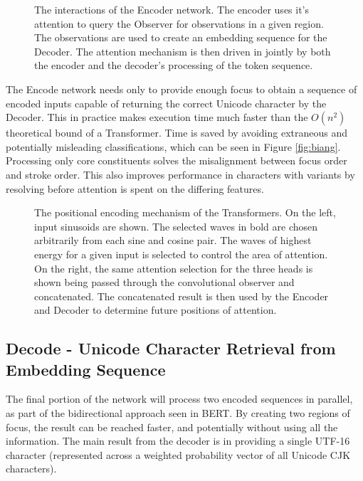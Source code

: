 \begin{figure*}[h]
    \begin{center}
        
        \caption[Embedding Sequence Generation]{The interactions of the Encoder network.
            The encoder uses it's attention to query the Observer for observations in a given region.
            The observations are used to create an embedding sequence for the Decoder.
            The attention mechanism is then driven in jointly by both the encoder and the decoder's processing of the token sequence. }
        \label{fig:encoder}
    \end{center}
\end{figure*}

The Encode network needs only to provide enough focus to obtain a sequence of encoded inputs capable of returning the correct Unicode character by the Decoder. This in practice makes execution time much faster than the $O(n^2)$ theoretical bound of a Transformer. Time is saved by avoiding extraneous and potentially misleading classifications, which can be seen in Figure \ref{fig:biang}. Processing only core constituents solves the misalignment between focus order and stroke order. This also improves performance in characters with variants by resolving before attention is spent on the differing features.

\begin{figure*}
    \begin{center}
        
        \caption[Multi-head Positional Encoding of Transformer]{The positional encoding mechanism of the Transformers. On the left, input sinusoids are shown. The selected waves in bold are chosen arbitrarily from each sine and cosine pair. The waves of highest energy for a given input is selected to control the area of attention. On the right, the same attention selection for the three heads is shown being passed through the convolutional observer and concatenated. The concatenated result is then used by the Encoder and Decoder to determine future positions of attention.}
        \label{fig:attention}
    \end{center}
\end{figure*}

\subsection{Decode - Unicode Character Retrieval from Embedding Sequence}
The final portion of the network will process two encoded sequences in parallel, as part of the bidirectional approach seen in BERT\cite{bert}. By creating two regions of focus, the result can be reached faster, and potentially without using all the information. The main result from the decoder is in providing a single UTF-16 character (represented across a weighted probability vector of all Unicode CJK characters).

